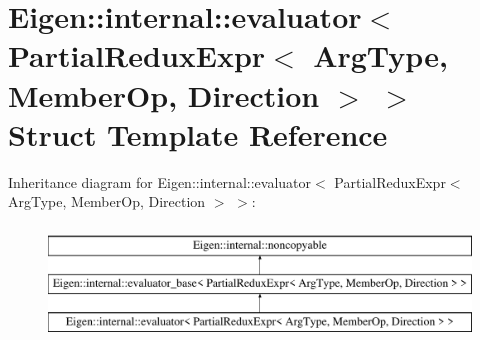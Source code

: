 \hypertarget{struct_eigen_1_1internal_1_1evaluator_3_01_partial_redux_expr_3_01_arg_type_00_01_member_op_00_01_direction_01_4_01_4}{}\section{Eigen\+::internal\+::evaluator$<$ Partial\+Redux\+Expr$<$ Arg\+Type, Member\+Op, Direction $>$ $>$ Struct Template Reference}
\label{struct_eigen_1_1internal_1_1evaluator_3_01_partial_redux_expr_3_01_arg_type_00_01_member_op_00_01_direction_01_4_01_4}
Inheritance diagram for Eigen\+::internal\+::evaluator$<$ Partial\+Redux\+Expr$<$ Arg\+Type, Member\+Op, Direction $>$ $>$\+:\begin{figure}[H]
\begin{center}
\leavevmode
\includegraphics[height=3.000000cm]{struct_eigen_1_1internal_1_1evaluator_3_01_partial_redux_expr_3_01_arg_type_00_01_member_op_00_01_direction_01_4_01_4}
\end{center}
\end{figure}

